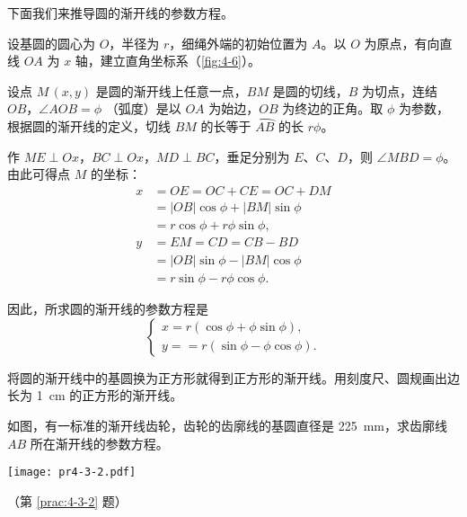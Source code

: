 下面我们来推导圆的渐开线的参数方程。

设基圆的圆心为 $O$，半径为 $r$，细绳外端的初始位置为 $A$。以 $O$ 为原点，有向直线 $OA$ 为 $x$ 轴，建立直角坐标系（\cref{fig:4-6}）。

设点 $M\,(x,y)$ 是圆的渐开线上任意一点，$BM$ 是圆的切线，$B$ 为切点，连结 $OB$，$\angle AOB= \phi$ （弧度）是以 $OA$ 为始边，$OB$ 为终边的正角。取 $\phi$ 为参数，根据圆的渐开线的定义，切线 $BM$ 的长等于 $\overparen{AB}$ 的长 $r\phi$。

作 $ME\perp Ox$，$BC\perp Ox$，$MD\perp BC$，垂足分别为 $E$、$C$、$D$，则 $\angle MBD=\phi$。由此可得点 $M$ 的坐标：
\begin{align*}
  x&=OE=OC+CE=OC+DM\\
  &=|OB|\cos\phi+|BM|\sin\phi\\
  &=r\cos\phi+r\phi\sin\phi,\\
  y&=EM=CD=CB-BD\\
  &=|OB|\sin\phi-|BM|\cos\phi\\
  &=r\sin\phi-r\phi\cos\phi.
\end{align*}

因此，所求圆的渐开线的参数方程是
\[\begin{cases}x=r(\cos\phi+\phi\sin\phi),\\y==r(\sin\phi-\phi\cos\phi).\end{cases}\]

\begin{Practice}\noindent
  \begin{minipage}{0.36\linewidth}
  \begin{question}
    \item 将圆的渐开线中的基圆换为正方形就得到正方形的渐开线。用刻度尺、圆规画出边长为 \qty{1}{cm} 的正方形的渐开线。
    \item \label{prac:4-3-2}如图，有一标准的渐开线齿轮，齿轮的齿廓线的基圆直径是 \qty{225}{mm}，求齿廓线 $AB$ 所在渐开线的参数方程。
  \end{question}
\end{minipage}\hfill
\begin{minipage}{0.59\linewidth}\centering
  \begin{figurehere}
    \begin{minipage}{\linewidth}\centering
      \texttt{[image: pr4-3-2.pdf]}
      \caption*{（第 \ref{prac:4-3-2} 题）}
    \end{minipage}
  \end{figurehere}
\end{minipage}
\end{Practice}

